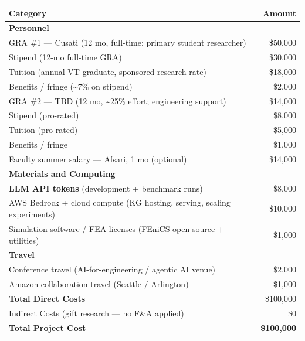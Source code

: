 \documentclass[10pt]{article}
\begin{document}
\begin{tabular}{p{4.4in} r}
  \toprule
  \textbf{Category}                                              & \textbf{Amount} \\
  \midrule
  \multicolumn{2}{l}{\textbf{Personnel}} \\
  \quad GRA \#1 --- Cusati (12 mo, full-time; primary student researcher)        & \$50,000 \\
  \quad\quad Stipend (12-mo full-time GRA)                                       & \$30,000 \\
  \quad\quad Tuition (annual VT graduate, sponsored-research rate)               & \$18,000 \\
  \quad\quad Benefits / fringe (\textasciitilde 7\% on stipend)                  & \$2,000 \\
  \quad GRA \#2 --- TBD (12 mo, \textasciitilde 25\% effort; engineering support) & \$14,000 \\
  \quad\quad Stipend (pro-rated)                                                 & \$8,000 \\
  \quad\quad Tuition (pro-rated)                                                 & \$5,000 \\
  \quad\quad Benefits / fringe                                                   & \$1,000 \\
  \quad Faculty summer salary --- Afsari, 1 mo (optional)                        & \$14,000 \\
  \midrule
  \multicolumn{2}{l}{\textbf{Materials and Computing}} \\
  \quad \textbf{LLM API tokens} (development + benchmark runs)                   & \$8,000 \\
  \quad AWS Bedrock + cloud compute (KG hosting, serving, scaling experiments)   & \$10,000 \\
  \quad Simulation software / FEA licenses (FEniCS open-source + utilities)      & \$1,000 \\
  \midrule
  \multicolumn{2}{l}{\textbf{Travel}} \\
  \quad Conference travel (AI-for-engineering / agentic AI venue)                & \$2,000 \\
  \quad Amazon collaboration travel (Seattle / Arlington)                        & \$1,000 \\
  \midrule
  \textbf{Total Direct Costs}                                                    & \$100,000 \\
  Indirect Costs (gift research --- no F\&A applied)                             & \$0 \\
  \midrule
  \textbf{Total Project Cost}                                                    & \textbf{\$100,000} \\
  \bottomrule
\end{tabular}
\end{document}
